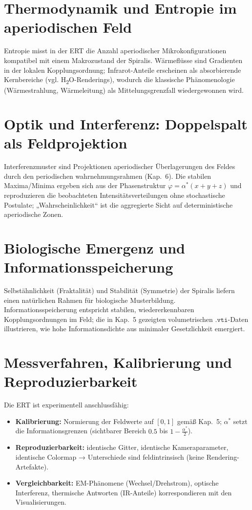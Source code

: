 \section{Thermodynamik und Entropie im aperiodischen Feld}
\label{sec:thermodynamik}
Entropie misst in der \acrshort{ERT} die Anzahl aperiodischer Mikrokonfigurationen kompatibel mit einem Makrozustand der Spiralis.
Wärmeflüsse sind Gradienten in der lokalen Kopplungsordnung; Infrarot-Anteile erscheinen als absorbierende Kernbereiche (vgl. H\textsubscript{2}O-Renderings), 
wodurch die klassische Phänomenologie (Wärmestrahlung, Wärmeleitung) als Mittelungsgrenzfall wiedergewonnen wird.

\section{Optik und Interferenz: Doppelspalt als Feldprojektion}
\label{sec:doppelspalt}
Interferenzmuster sind Projektionen aperiodischer Überlagerungen des Feldes durch den periodischen \gls{wahrnehmungsrahmen} (Kap.~6).
Die stabilen Maxima/Minima ergeben sich aus der Phasenstruktur \(\varphi=\alpha^*(x+y+z)\) und reproduzieren die beobachteten Intensitätsverteilungen ohne stochastische Postulate; 
„Wahrscheinlichkeit“ ist die aggregierte Sicht auf deterministische aperiodische Zonen.

\section{Biologische Emergenz und Informationsspeicherung}
\label{sec:biologie}
Selbstähnlichkeit (Fraktalität) und Stabilität (Symmetrie) der Spiralis liefern einen natürlichen Rahmen für biologische Musterbildung. 
Informationsspeicherung entspricht stabilen, wiedererkennbaren Kopplungsordnungen im Feld; 
die in Kap.~5 gezeigten volumetrischen \(\texttt{.vti}\)-Daten illustrieren, wie hohe Informationsdichte aus minimaler Gesetzlichkeit emergiert.

\section{Messverfahren, Kalibrierung und Reproduzierbarkeit}
\label{sec:anschluss}
Die \acrshort{ERT} ist experimentell anschlussfähig:
\begin{itemize}
  \item \textbf{Kalibrierung:} Normierung der Feldwerte auf \([0,1]\) gemäß Kap.~5; \(\alpha^*\) setzt die Informationsgrenzen (sichtbarer Bereich \(0.5\) bis \(1-\tfrac{\alpha^*}{2}\)).
  \item \textbf{Reproduzierbarkeit:} identische Gitter, identische Kameraparameter, identische Colormap → Unterschiede sind feldintrinsisch (keine Rendering-Artefakte).
  \item \textbf{Vergleichbarkeit:} EM-Phänomene (Wechsel/Drehstrom), optische Interferenz, thermische Antworten (IR-Anteile) korrespondieren mit den Visualisierungen.
\end{itemize}

